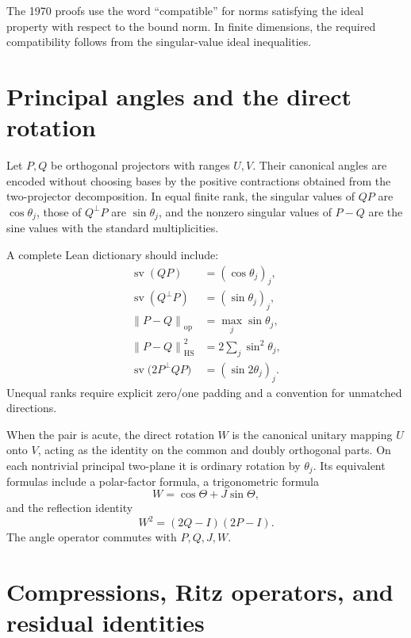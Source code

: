 \documentclass[11pt]{article}
\newcommand{\sv}{\operatorname{sv}}
\newcommand{\op}{\mathrm{op}}
\newcommand{\HS}{\mathrm{HS}}
\newcommand{\norm}[1]{\left\lVert#1\right\rVert}
\theoremstyle{remark}
\begin{document}
The 1970 proofs use the word ``compatible'' for norms satisfying the ideal
property with respect to the bound norm.  In finite dimensions, the required
compatibility follows from the singular-value ideal inequalities.

\section{Principal angles and the direct rotation}

Let \(P,Q\) be orthogonal projectors with ranges \(U,V\).  Their canonical
angles are encoded without choosing bases by the positive contractions obtained
from the two-projector decomposition.  In equal finite rank, the singular
values of \(QP\) are \(\cos\theta_j\), those of \(Q^\perp P\) are
\(\sin\theta_j\), and the nonzero singular values of \(P-Q\) are the sine
values with the standard multiplicities.

A complete Lean dictionary should include:
\begin{align*}
  \sv(QP)&=(\cos\theta_j)_j,\\
  \sv(Q^\perp P)&=(\sin\theta_j)_j,\\
  \norm{P-Q}_{\op}&=\max_j\sin\theta_j,\\
  \norm{P-Q}_{\HS}^2&=2\sum_j\sin^2\theta_j,\\
  \sv\bigl(2P^\perp QP\bigr)&=(\sin 2\theta_j)_j.
\end{align*}
Unequal ranks require explicit zero/one padding and a convention for unmatched
directions.

When the pair is acute, the direct rotation \(W\) is the canonical unitary
mapping \(U\) onto \(V\), acting as the identity on the common and doubly
orthogonal parts.  On each nontrivial principal two-plane it is ordinary
rotation by \(\theta_j\).  Its equivalent formulas include a polar-factor
formula, a trigonometric formula
\[
  W=\cos\Theta+J\sin\Theta,
\]
and the reflection identity
\[
  W^2=(2Q-I)(2P-I).
\]
The angle operator commutes with \(P,Q,J,W\).

\section{Compressions, Ritz operators, and residual identities}
\end{document}
